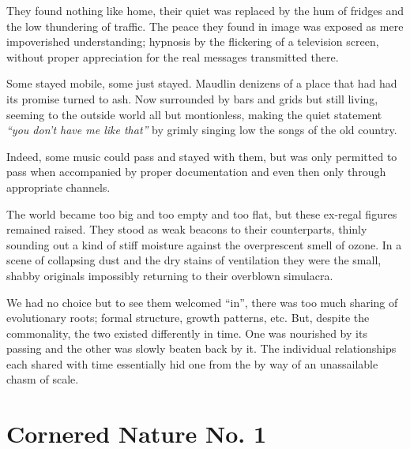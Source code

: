 \documentclass{book}
\begin{document}
They found nothing like home, their quiet was replaced by the hum of fridges
and the low thundering of traffic. The peace they found in image was exposed as
mere impoverished understanding; hypnosis by the flickering of a television
screen, without proper appreciation for the real messages transmitted there.

Some stayed mobile, some just stayed. Maudlin denizens of a place that had had
its promise turned to ash. Now surrounded by bars and grids but still living,
seeming to the outside world all but montionless, making the quiet statement
\emph{``you don't have me like that''} by grimly singing low the songs of the
old country.

Indeed, some music could pass and stayed with them, but was only permitted to
pass when accompanied by proper documentation and even then only through
appropriate channels.

The world became too big and too empty and too flat, but these ex-regal figures
remained raised. They stood as weak beacons to their counterparts, thinly
sounding out a kind of stiff moisture against the overprescent smell of ozone.
In a scene of collapsing dust and the dry stains of ventilation they were the
small, shabby originals impossibly returning to their overblown simulacra.

We had no choice but to see them welcomed ``in'', there was too much sharing of
evolutionary roots; formal structure, growth patterns, etc. But, despite the
commonality, the two existed differently in time. One was nourished by its
passing and the other was slowly beaten back by it. The individual
relationships each shared with time essentially hid one from the by way of an
unassailable chasm of scale.

\chapter{Cornered Nature No. 1}
\end{document}
